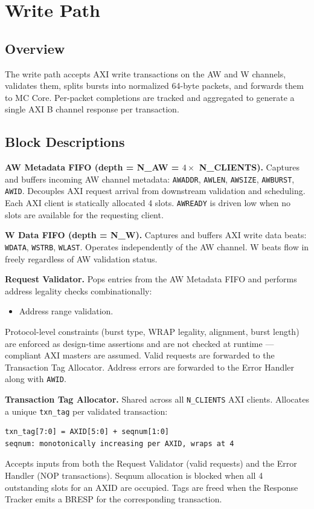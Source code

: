 \documentclass[11pt, a4paper]{article}
\begin{document}
\section{Write Path}

\subsection{Overview}

The write path accepts AXI write transactions on the AW and W channels, validates them, splits bursts into normalized 64-byte packets, and forwards them to MC Core. Per-packet completions are tracked and aggregated to generate a single AXI B channel response per transaction.

\subsection{Block Descriptions}

\textbf{AW Metadata FIFO (depth = N\_AW = $4 \times$ N\_CLIENTS).}
Captures and buffers incoming AW channel metadata: \texttt{AWADDR}, \texttt{AWLEN}, \texttt{AWSIZE}, \texttt{AWBURST}, \texttt{AWID}. Decouples AXI request arrival from downstream validation and scheduling. Each AXI client is statically allocated 4 slots. \texttt{AWREADY} is driven low when no slots are available for the requesting client.

\textbf{W Data FIFO (depth = N\_W).}
Captures and buffers AXI write data beats: \texttt{WDATA}, \texttt{WSTRB}, \texttt{WLAST}. Operates independently of the AW channel. W beats flow in freely regardless of AW validation status.

\textbf{Request Validator.}
Pops entries from the AW Metadata FIFO and performs address legality checks combinationally:
\begin{itemize}[noitemsep]
    \item Address range validation.
\end{itemize}
Protocol-level constraints (burst type, WRAP legality, alignment, burst length) are enforced as design-time assertions and are not checked at runtime — compliant AXI masters are assumed. Valid requests are forwarded to the Transaction Tag Allocator. Address errors are forwarded to the Error Handler along with \texttt{AWID}.

\textbf{Transaction Tag Allocator.}
Shared across all \texttt{N\_CLIENTS} AXI clients. Allocates a unique \texttt{txn\_tag} per validated transaction:
\begin{lstlisting}
txn_tag[7:0] = AXID[5:0] + seqnum[1:0]
seqnum: monotonically increasing per AXID, wraps at 4
\end{lstlisting}
Accepts inputs from both the Request Validator (valid requests) and the Error Handler (NOP transactions). Seqnum allocation is blocked when all 4 outstanding slots for an AXID are occupied. Tags are freed when the Response Tracker emits a BRESP for the corresponding transaction.
\end{document}
